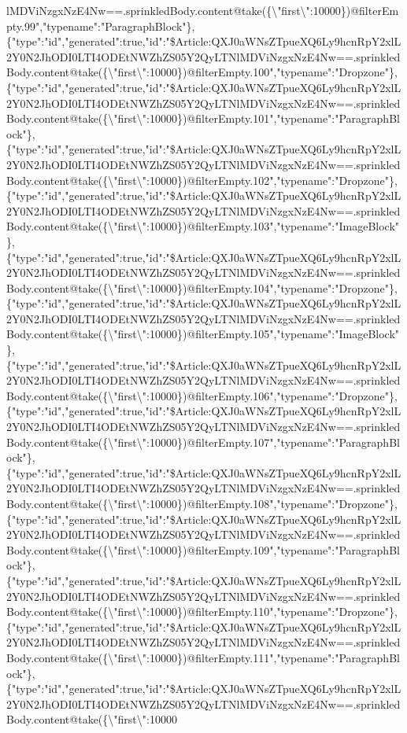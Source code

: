 lMDViNzgxNzE4Nw==.sprinkledBody.content@take(\{\textbackslash{}"first\textbackslash{}":10000\})@filterEmpty.99","typename":"ParagraphBlock"\},\{"type":"id","generated":true,"id":"\$Article:QXJ0aWNsZTpueXQ6Ly9hcnRpY2xlL2Y0N2JhODI0LTI4ODEtNWZhZS05Y2QyLTNlMDViNzgxNzE4Nw==.sprinkledBody.content@take(\{\textbackslash{}"first\textbackslash{}":10000\})@filterEmpty.100","typename":"Dropzone"\},\{"type":"id","generated":true,"id":"\$Article:QXJ0aWNsZTpueXQ6Ly9hcnRpY2xlL2Y0N2JhODI0LTI4ODEtNWZhZS05Y2QyLTNlMDViNzgxNzE4Nw==.sprinkledBody.content@take(\{\textbackslash{}"first\textbackslash{}":10000\})@filterEmpty.101","typename":"ParagraphBlock"\},\{"type":"id","generated":true,"id":"\$Article:QXJ0aWNsZTpueXQ6Ly9hcnRpY2xlL2Y0N2JhODI0LTI4ODEtNWZhZS05Y2QyLTNlMDViNzgxNzE4Nw==.sprinkledBody.content@take(\{\textbackslash{}"first\textbackslash{}":10000\})@filterEmpty.102","typename":"Dropzone"\},\{"type":"id","generated":true,"id":"\$Article:QXJ0aWNsZTpueXQ6Ly9hcnRpY2xlL2Y0N2JhODI0LTI4ODEtNWZhZS05Y2QyLTNlMDViNzgxNzE4Nw==.sprinkledBody.content@take(\{\textbackslash{}"first\textbackslash{}":10000\})@filterEmpty.103","typename":"ImageBlock"\},\{"type":"id","generated":true,"id":"\$Article:QXJ0aWNsZTpueXQ6Ly9hcnRpY2xlL2Y0N2JhODI0LTI4ODEtNWZhZS05Y2QyLTNlMDViNzgxNzE4Nw==.sprinkledBody.content@take(\{\textbackslash{}"first\textbackslash{}":10000\})@filterEmpty.104","typename":"Dropzone"\},\{"type":"id","generated":true,"id":"\$Article:QXJ0aWNsZTpueXQ6Ly9hcnRpY2xlL2Y0N2JhODI0LTI4ODEtNWZhZS05Y2QyLTNlMDViNzgxNzE4Nw==.sprinkledBody.content@take(\{\textbackslash{}"first\textbackslash{}":10000\})@filterEmpty.105","typename":"ImageBlock"\},\{"type":"id","generated":true,"id":"\$Article:QXJ0aWNsZTpueXQ6Ly9hcnRpY2xlL2Y0N2JhODI0LTI4ODEtNWZhZS05Y2QyLTNlMDViNzgxNzE4Nw==.sprinkledBody.content@take(\{\textbackslash{}"first\textbackslash{}":10000\})@filterEmpty.106","typename":"Dropzone"\},\{"type":"id","generated":true,"id":"\$Article:QXJ0aWNsZTpueXQ6Ly9hcnRpY2xlL2Y0N2JhODI0LTI4ODEtNWZhZS05Y2QyLTNlMDViNzgxNzE4Nw==.sprinkledBody.content@take(\{\textbackslash{}"first\textbackslash{}":10000\})@filterEmpty.107","typename":"ParagraphBlock"\},\{"type":"id","generated":true,"id":"\$Article:QXJ0aWNsZTpueXQ6Ly9hcnRpY2xlL2Y0N2JhODI0LTI4ODEtNWZhZS05Y2QyLTNlMDViNzgxNzE4Nw==.sprinkledBody.content@take(\{\textbackslash{}"first\textbackslash{}":10000\})@filterEmpty.108","typename":"Dropzone"\},\{"type":"id","generated":true,"id":"\$Article:QXJ0aWNsZTpueXQ6Ly9hcnRpY2xlL2Y0N2JhODI0LTI4ODEtNWZhZS05Y2QyLTNlMDViNzgxNzE4Nw==.sprinkledBody.content@take(\{\textbackslash{}"first\textbackslash{}":10000\})@filterEmpty.109","typename":"ParagraphBlock"\},\{"type":"id","generated":true,"id":"\$Article:QXJ0aWNsZTpueXQ6Ly9hcnRpY2xlL2Y0N2JhODI0LTI4ODEtNWZhZS05Y2QyLTNlMDViNzgxNzE4Nw==.sprinkledBody.content@take(\{\textbackslash{}"first\textbackslash{}":10000\})@filterEmpty.110","typename":"Dropzone"\},\{"type":"id","generated":true,"id":"\$Article:QXJ0aWNsZTpueXQ6Ly9hcnRpY2xlL2Y0N2JhODI0LTI4ODEtNWZhZS05Y2QyLTNlMDViNzgxNzE4Nw==.sprinkledBody.content@take(\{\textbackslash{}"first\textbackslash{}":10000\})@filterEmpty.111","typename":"ParagraphBlock"\},\{"type":"id","generated":true,"id":"\$Article:QXJ0aWNsZTpueXQ6Ly9hcnRpY2xlL2Y0N2JhODI0LTI4ODEtNWZhZS05Y2QyLTNlMDViNzgxNzE4Nw==.sprinkledBody.content@take(\{\textbackslash{}"first\textbackslash{}":10000